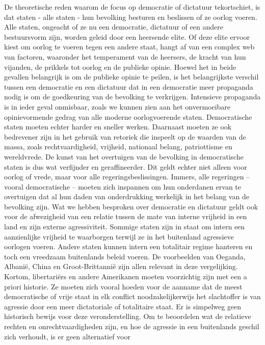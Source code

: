 \documentclass[
  a5paper,
  smalldemyvopaper,10pt,twoside,onecolumn,openright,extrafontsizes,hidelinks]{memoir}
\begin{document}
De theoretische reden waarom de focus op democratie of dictatuur
tekortschiet, is dat staten - alle staten - hun bevolking besturen en
beslissen of ze oorlog voeren. Alle staten, ongeacht of ze nu een
democratie, dictatuur of een andere bestuursvorm zijn, worden geleid
door een heersende elite. Of deze elite ervoor kiest om oorlog te voeren
tegen een andere staat, hangt af van een complex web van factoren,
waaronder het temperament van de heersers, de kracht van hun vijanden,
de prikkels tot oorlog en de publieke opinie. Hoewel het in beide
gevallen belangrijk is om de publieke opinie te peilen, is het
belangrijkste verschil tussen een democratie en een dictatuur dat in een
democratie meer propaganda nodig is om de goedkeuring van de bevolking
te verkrijgen. Intensieve propaganda is in ieder geval onmisbaar, zoals
we kunnen zien aan het onvermoeibare opinievormende gedrag van alle
moderne oorlogvoerende staten. Democratische staten moeten echter harder
en sneller werken. Daarnaast moeten ze ook bedrevener zijn in het
gebruik van retoriek die inspeelt op de waarden van de massa, zoals
rechtvaardigheid, vrijheid, nationaal belang, patriottisme en
wereldvrede. De kunst van het overtuigen van de bevolking in
democratische staten is dus wat verfijnder en geraffineerder. Dit geldt
echter niet alleen voor oorlog of vrede, maar voor alle
regeringsbeslissingen. Immers, alle regeringen -- vooral democratische
-- moeten zich inspannen om hun onderdanen ervan te overtuigen dat al
hun daden van onderdrukking werkelijk in het belang van de bevolking
zijn. Wat we hebben besproken over democratie en dictatuur geldt ook
voor de afwezigheid van een relatie tussen de mate van interne vrijheid
in een land en zijn externe agressiviteit. Sommige staten zijn in staat
om intern een aanzienlijke vrijheid te waarborgen terwijl ze in het
buitenland agressieve oorlogen voeren. Andere staten kunnen intern een
totalitair regime hanteren en toch een vreedzaam buitenlands beleid
voeren. De voorbeelden van Oeganda, Albanië, China en Groot-Brittannië
zijn allen relevant in deze vergelijking. Kortom, libertariërs en andere
Amerikanen moeten voorzichtig zijn met een a priori historie. Ze moeten
zich vooral hoeden voor de aanname dat de meest democratische of vrije
staat in elk conflict noodzakelijkerwijs het slachtoffer is van agressie
door een meer dictatoriale of totalitaire staat. Er is simpelweg geen
historisch bewijs voor deze veronderstelling. Om te beoordelen wat de
relatieve rechten en onrechtvaardigheden zijn, en hoe de agressie in een
buitenlands geschil zich verhoudt, is er geen alternatief voor
\end{document}

